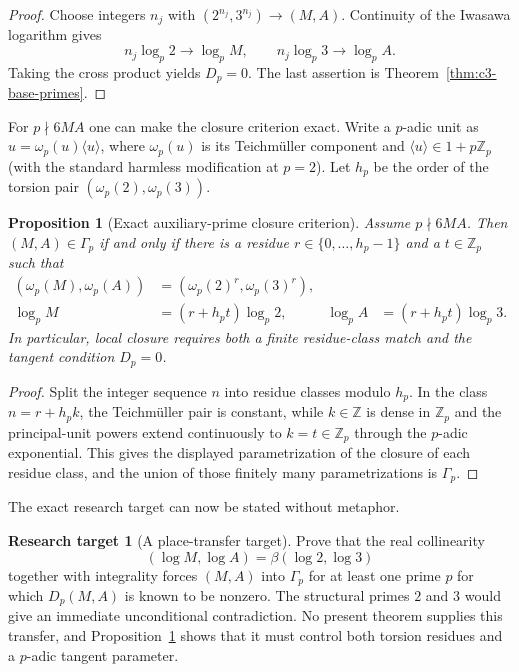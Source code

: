 \documentclass[11pt,oneside]{article}
\newtheorem{proposition}[theorem]{Proposition}
\theoremstyle{definition}
\newtheorem{target}[theorem]{Research target}
\theoremstyle{remark}
\newcommand{\Z}{\mathbb Z}
\begin{document}
\begin{proof}
Choose integers $n_j$ with $(2^{n_j},3^{n_j})\to(M,A)$.  Continuity of the Iwasawa logarithm
gives
\[
 n_j\log_p2\to\log_pM,
 \qquad
 n_j\log_p3\to\log_pA.
\]
Taking the cross product yields $D_p=0$.  The last assertion is
Theorem~\ref{thm:c3-base-primes}.
\end{proof}

For $p\nmid6MA$ one can make the closure criterion exact.  Write a $p$-adic unit as
$u=\omega_p(u)\langle u\rangle$, where $\omega_p(u)$ is its Teichm\"uller component and
$\langle u\rangle\in1+p\Z_p$ (with the standard harmless modification at $p=2$).  Let $h_p$
be the order of the torsion pair $(\omega_p(2),\omega_p(3))$.

\begin{proposition}[Exact auxiliary-prime closure criterion]
\label{prop:c3-exact-closure}
Assume $p\nmid6MA$.  Then $(M,A)\in\Gamma_p$ if and only if there is a residue
$r\in\{0,\ldots,h_p-1\}$ and a $t\in\Z_p$ such that
\begin{align}
 (\omega_p(M),\omega_p(A))
   &=(\omega_p(2)^r,\omega_p(3)^r),\label{eq:c3-torsion-match}\\
 \log_pM&=(r+h_pt)\log_p2,
 &\log_pA&=(r+h_pt)\log_p3.
 \label{eq:c3-principal-match}
\end{align}
In particular, local closure requires both a finite residue-class match and the tangent
condition $D_p=0$.
\end{proposition}

\begin{proof}
Split the integer sequence $n$ into residue classes modulo $h_p$.  In the class
$n=r+h_pk$, the Teichm\"uller pair is constant, while $k\in\Z$ is dense in $\Z_p$ and the
principal-unit powers extend continuously to $k=t\in\Z_p$ through the $p$-adic exponential.
This gives the displayed parametrization of the closure of each residue class, and the union
of those finitely many parametrizations is $\Gamma_p$.
\end{proof}

The exact research target can now be stated without metaphor.

\begin{target}[A place-transfer target]
\label{target:c3-place-transfer}
Prove that the real collinearity
\[
 (\log M,\log A)=\beta(\log2,\log3)
\]
together with integrality forces $(M,A)$ into $\Gamma_p$ for at least one prime $p$ for which
$D_p(M,A)$ is known to be nonzero.  The structural primes $2$ and $3$ would give an immediate
unconditional contradiction.  No present theorem supplies this transfer, and
Proposition~\ref{prop:c3-exact-closure} shows that it must control both torsion residues and a
$p$-adic tangent parameter.
\end{target}
\end{document}
